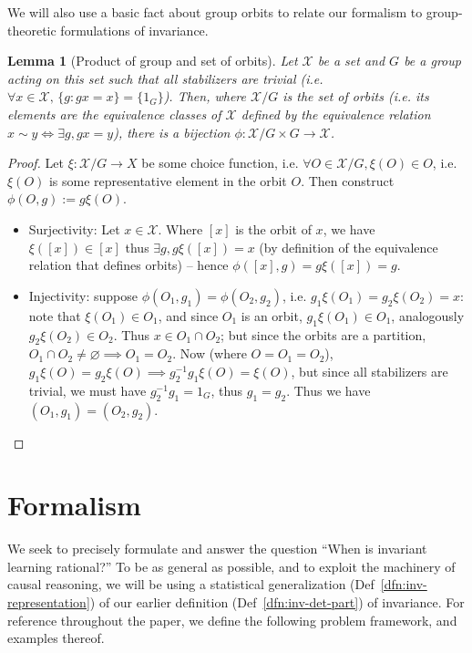 \documentclass[12pt]{article}
\newtheorem{lem}[thm]{Lemma}
\theoremstyle{definition}
\numberwithin{equation}{section}
\numberwithin{figure}{section}
\numberwithin{table}{section}
\begin{document}
We will also use a basic fact about group orbits to relate our formalism to group-theoretic formulations of invariance.

\begin{lem}[Product of group and set of orbits]
    \label{lem:group}
    Let $\mathcal{X}$ be a set and $G$ be a group acting on this set such that all stabilizers are trivial (i.e. $\forall x\in\mathcal{X},\, \{g:g x = x\} = \{1_G\}$). Then, where $\mathcal{X}/G$ is the set of orbits (i.e. its elements are the equivalence classes of $\mathcal{X}$ defined by the equivalence relation $x\sim y\iff \exists g, g x = y$), there is a bijection $\phi:\mathcal{X}/G\times G\to \mathcal{X}$.
\end{lem}
\begin{proof}
    Let $\xi:\mathcal{X}/G\to X$ be some choice function, i.e. $\forall O\in \mathcal{X}/G, \xi(O)\in O$, i.e. $\xi(O)$ is some representative element in the orbit $O$. Then construct $\phi(O, g):=g\xi(O)$. 
    \begin{itemize}
        \item Surjectivity: Let $x\in \mathcal{X}$. Where $[x]$ is the orbit of $x$, we have $\xi([x])\in [x]$ thus $\exists g, g\xi([x])=x$ (by definition of the equivalence relation that defines orbits) -- hence $\phi([x], g)=g\xi([x])=g$.
        \item Injectivity: suppose $\phi(O_1, g_1)=\phi(O_2, g_2)$, i.e. $g_1\xi(O_1)=g_2\xi(O_2)=x$: note that $\xi(O_1)\in O_1$, and since $O_1$ is an orbit, $g_1\xi(O_1)\in O_1$, analogously $g_2\xi(O_2)\in O_2$. Thus $x\in O_1\cap O_2$; but since the orbits are a partition, $O_1\cap O_2\ne\varnothing\implies O_1=O_2$. Now (where $O=O_1=O_2$), $g_1\xi(O)=g_2\xi(O)\implies g_2^{-1}g_1\xi(O)=\xi(O)$, but since all stabilizers are trivial, we must have $g_2^{-1}g_1=1_G$, thus $g_1=g_2$. Thus we have $(O_1, g_1)=(O_2, g_2)$. 
    \end{itemize}
\end{proof}

\pagebreak
\section{Formalism}
\label{sec:q}

We seek to precisely formulate and answer the question ``When is invariant learning rational?'' To be as general as possible, and to exploit the machinery of causal reasoning, we will be using a statistical generalization (Def~\ref{dfn:inv-representation}) of our earlier definition (Def~\ref{dfn:inv-det-part}) of invariance. For reference throughout the paper, we define the following problem framework, and examples thereof.
\end{document}
